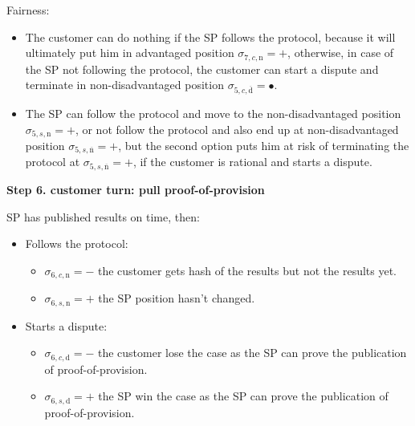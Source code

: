 \documentclass{ieeeaccess}
\begin{document}
Fairness:

\begin{itemize}

\item
  The customer can do nothing if the SP follows the protocol, because it
  will ultimately put him in advantaged position
  \(\sigma_{7, c, \mathrm{n}} = +\), otherwise, in case of the SP not
  following the protocol, the customer can start a dispute and terminate
  in non-disadvantaged position
  \(\sigma_{5, c, \overline{\mathrm{d}}} = •\).
\item
  The SP can follow the protocol and move to the non-disadvantaged
  position \(\sigma_{5, s, \mathrm{n}} = +\), or not follow the protocol
  and also end up at non-disadvantaged position
  \(\sigma_{5, s, \overline{\mathrm{n}}} = +\), but the second option
  puts him at risk of terminating the protocol at
  \(\sigma_{5, s, \overline{\mathrm{n}}} = +\), if the customer is
  rational and starts a dispute.
\end{itemize}


\noindent \textbf
{Step 6. customer turn: pull proof-of-provision}\label{step-6-pull-proof-of-provision}

SP has published results on time, then:

\begin{itemize}
\item
  Follows the protocol:

  \begin{itemize}
  
  \item
    \(\sigma_{6, c, \mathrm{n}} = -\) the customer gets hash of the
    results but not the results yet.
  \item
    \(\sigma_{6, s, \mathrm{n}} = +\) the SP position hasn't changed.
  \end{itemize}
\item
  Starts a dispute:

  \begin{itemize}
  
  \item
    \(\sigma_{6, c, \mathrm{d}} = -\) the customer lose the case as the
    SP can prove the publication of proof-of-provision.
  \item
    \(\sigma_{6, s, \mathrm{d}} = +\) the SP win the case as the SP can
    prove the publication of proof-of-provision.
  \end{itemize}
\end{itemize}
\end{document}
